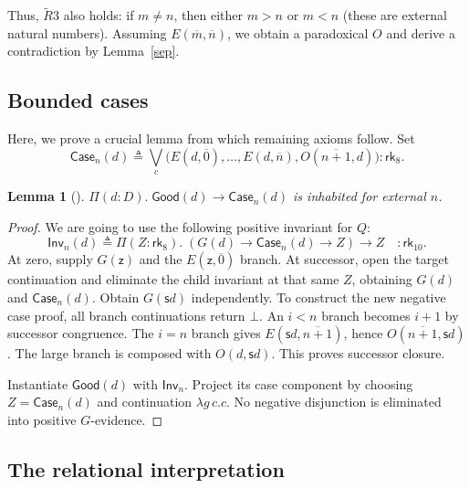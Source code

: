 \documentclass{article}
\newtheorem{lemma}{Lemma}
\theoremstyle{definition}
\theoremstyle{remark}
\newcommand{\rk}[1]{\mathsf{rk}_{#1}}
\newcommand{\Good}{\mathsf{Good}}
\newcommand{\Case}{\mathsf{Case}}
\newcommand{\Inv}{\mathsf{Inv}}
\newcommand{\z}{\mathsf z}
\newcommand{\suc}{\mathsf s}
\begin{document}
Thus, $\widetilde R3$ also holds: if $m\ne n$, then
either $m>n$ or $m<n$ (these are external natural
numbers). Assuming $E(\overline{m},\overline{n})$, we
obtain a paradoxical $O$ and derive a contradiction by
Lemma~\ref{sep}.

\subsection{Bounded cases}\label{bounded-cases}

Here, we prove a crucial lemma from which remaining
axioms follow. Set
\[
    \Case_n(d)\triangleq\bigvee_c
    \bigl(E(d,\overline{0}),\ldots,E(d,\overline{n}),
    O(\overline{n+1},d)\bigr):\rk8.
\]
\begin{lemma}
    []
    \label{case}
    $\Pi(d:D).\;\Good(d)\to\Case_n(d)$ is inhabited for
    external $n$.
\end{lemma}
\begin{proof}
    We are going to use the following positive
    invariant for $Q$:
    \[
        \Inv_n(d)\triangleq\Pi(Z:\rk8).\;(G(d)\to
        \Case_n(d)\to Z)\to Z\quad:\rk{10}.
    \]
    At zero, supply $G(\z)$ and the
    $E(\z,\overline{0})$
    branch. At successor, open the target continuation
    and eliminate the child invariant at that same $Z$,
    obtaining $G(d)$ and $\Case_n(d)$. Obtain
    $G(\suc d)$ independently.
    To construct the new negative case proof, all
    branch continuations return $\bot$. An $i<n$ branch
    becomes $i+1$ by successor congruence. The $i=n$
    branch gives $E(\suc d,\overline{n+1})$, hence
    $O(\overline{n+1},\suc d)$. The large branch is
    composed with $O(d,\suc d)$. This proves successor
    closure.

    Instantiate $\Good(d)$ with $\Inv_n$. Project its
    case component by choosing $Z=\Case_n(d)$ and
    continuation $\lambda g\,c.c$. No negative
    disjunction is eliminated into positive
    $G$-evidence.
\end{proof}

\subsection{The relational interpretation}
\end{document}
